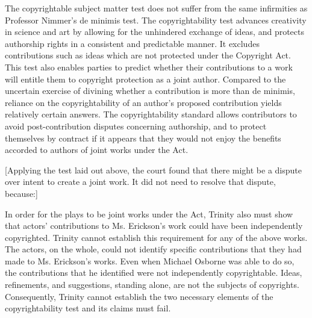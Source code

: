 The copyrightable subject matter test does not suffer from the same infirmities
as Professor Nimmer's de minimis test. The copyrightability test advances
creativity in science and art by allowing for the unhindered exchange of ideas,
and protects authorship rights in a consistent and predictable manner. It
excludes contributions such as ideas which are not protected under the Copyright
Act. This test also enables parties to
predict whether their contributions to a work will entitle them to copyright
protection as a joint author. Compared to the uncertain exercise of divining
whether a contribution is more than de minimis, reliance on the copyrightability
of an author's proposed contribution yields relatively certain answers.
The copyrightability standard allows contributors to avoid
post-contribution disputes concerning authorship, and to protect themselves by
contract if it appears that they would not enjoy the benefits accorded to
authors of joint works under the Act.

[Applying the test laid out above, the court found that there might be a dispute
over intent to create a joint work. It did not need to resolve that dispute,
because:]

In order for the plays to be joint works under the Act, Trinity also must show
that actors' contributions to Ms. Erickson's work could have been independently
copyrighted. Trinity cannot establish this requirement for any of the above
works. The actors, on the whole, could not identify specific contributions that
they had made to Ms. Erickson's works. Even when Michael Osborne was able to do
so, the contributions that he identified were not independently copyrightable.
Ideas, refinements, and suggestions, standing alone, are not the subjects of
copyrights. Consequently, Trinity cannot establish the two necessary elements of
the copyrightability test and its claims must fail.

